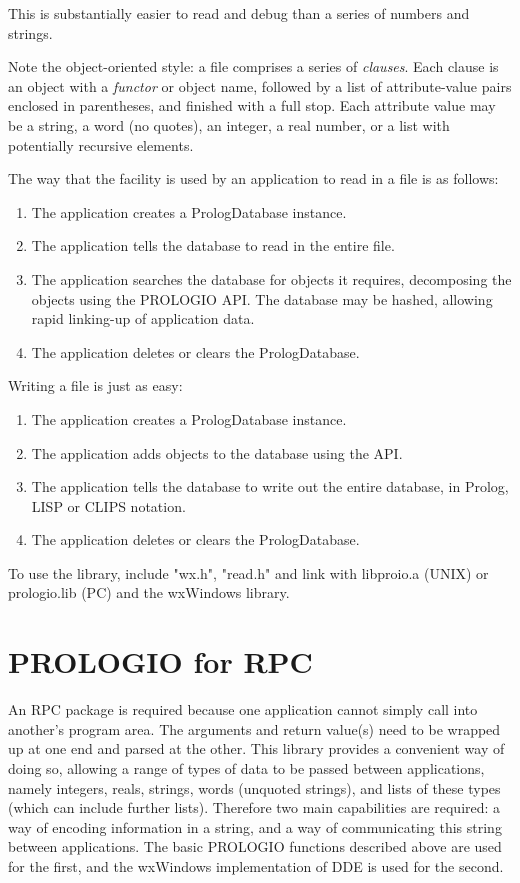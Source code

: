 This is substantially easier to read and debug than a series of numbers and
strings.

Note the object-oriented style: a file comprises a series of {\it clauses}.
Each clause is an object with a {\it functor}\/ or object name, followed
by a list of attribute-value pairs enclosed in parentheses, and finished
with a full stop.  Each attribute value may be a string, a word (no quotes),
an integer, a real number, or a list with potentially recursive elements.

The way that the facility is used by an application to read in a file is
as follows:

\begin{enumerate}
\item The application creates a PrologDatabase instance.
\item The application tells the database to read in the entire file.
\item The application searches the database for objects it requires,
decomposing the objects using the PROLOGIO API. The database may be hashed,
allowing rapid linking-up of application data.
\item The application deletes or clears the PrologDatabase.
\end{enumerate}

Writing a file is just as easy:

\begin{enumerate}
\item The application creates a PrologDatabase instance.
\item The application adds objects to the database using the API.
\item The application tells the database to write out the entire database,
in Prolog, LISP or CLIPS notation.
\item The application deletes or clears the PrologDatabase.
\end{enumerate}

To use the library, include "wx.h", "read.h" and link with libproio.a
(UNIX) or prologio.lib (PC) and the wxWindows library.

\section{PROLOGIO for RPC}

An RPC package is required because one application cannot simply call
into another's program area. The arguments and return value(s) need to
be wrapped up at one end and parsed at the other. This library provides
a convenient way of doing so, allowing a range of types of data to be passed
between applications, namely integers, reals, strings, words (unquoted
strings), and lists of these types (which can include further lists).
Therefore two main capabilities are required: a way of encoding
information in a string, and a way of communicating this string between
applications.  The basic PROLOGIO functions described above are used for
the first, and the wxWindows implementation of DDE is used for the
second.

